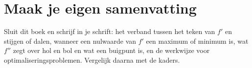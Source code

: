 
\begin{oefeningen}






\end{oefeningen}


\ifzelfstudie
\section*{Maak je eigen samenvatting}
Sluit dit boek en schrijf in je schrift: het verband tussen het teken van $f'$ en stijgen of dalen, wanneer een nulwaarde van $f'$ een maximum of minimum is, wat $f''$ zegt over hol en bol en wat een buigpunt is, en de werkwijze voor optimaliseringsproblemen. Vergelijk daarna met de kaders.
\fi

